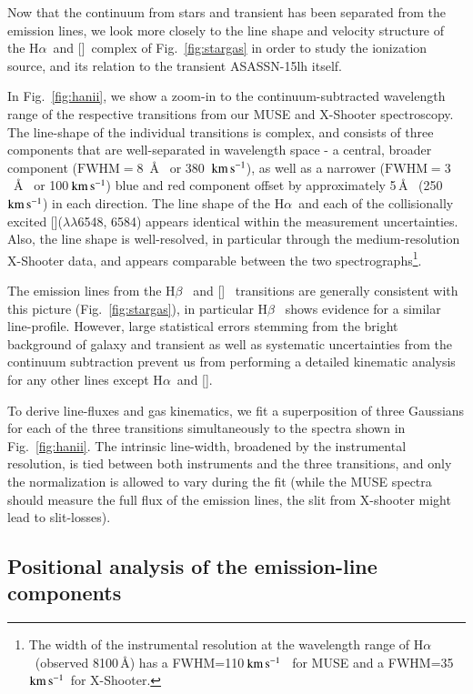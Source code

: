 \documentclass[traditabstract]{aa}
\newcommand{\kms}{$\rm{km\,s^{-1}}$}
\newcommand{\hb}{H$\beta$}
\newcommand{\ha}{H$\alpha$}
\newcommand{\oiii}{[\ion{O}{iii}]}
\newcommand{\nii}{[\ion{N}{ii}]}
\begin{document}
Now that the continuum from stars and transient has been separated from the emission lines, we look more closely to the line shape and velocity structure of the \ha\, and \nii\, complex of Fig.~\ref{fig:stargas} in order to study the ionization source, and its relation to the transient ASASSN-15lh itself.

In Fig.~\ref{fig:hanii}, we show a zoom-in to the continuum-subtracted wavelength range of the respective transitions from our MUSE and X-Shooter spectroscopy. The line-shape of the individual transitions is complex, and consists of three components that are well-separated in wavelength space - a central, broader component ($\mathrm{FWHM}=8$~\AA~ or 380~\kms), as well as a narrower ($\mathrm{FWHM}=3$~\AA~ or 100\,\kms) blue and red component offset by approximately 5\,\AA~ (250~\kms) in each direction. The line shape of the \ha\, and each of the collisionally excited \nii($\lambda\lambda$6548, 6584) appears identical within the measurement uncertainties. Also, the line shape is well-resolved, in particular through the medium-resolution X-Shooter data, and appears comparable between the two spectrographs\footnote{The width of the instrumental resolution at the wavelength range of \ha~(observed 8100\,\AA) has a FWHM=110\,\kms~ for MUSE and a FWHM=35\,\kms~for X-Shooter.}.

The emission lines from the \hb~ and \oiii~ transitions are generally consistent with this picture (Fig.~\ref{fig:stargas}), in particular \hb~ shows evidence for a similar line-profile. However, large statistical errors stemming from the bright background of galaxy and transient as well as systematic uncertainties from the continuum subtraction prevent us from performing a detailed kinematic analysis for any other lines except \ha~and \nii.

To derive line-fluxes and gas kinematics, we fit a superposition of three Gaussians for each of the three transitions simultaneously to the spectra shown in Fig.~\ref{fig:hanii}. The intrinsic line-width, broadened by the instrumental resolution, is tied between both instruments and the three transitions, and only the normalization is allowed to vary during the fit (while the MUSE spectra should measure the full flux of the emission lines, the slit from X-shooter might lead to slit-losses). %

\subsection{Positional analysis of the emission-line components}
\label{sec:posana}
\end{document}
